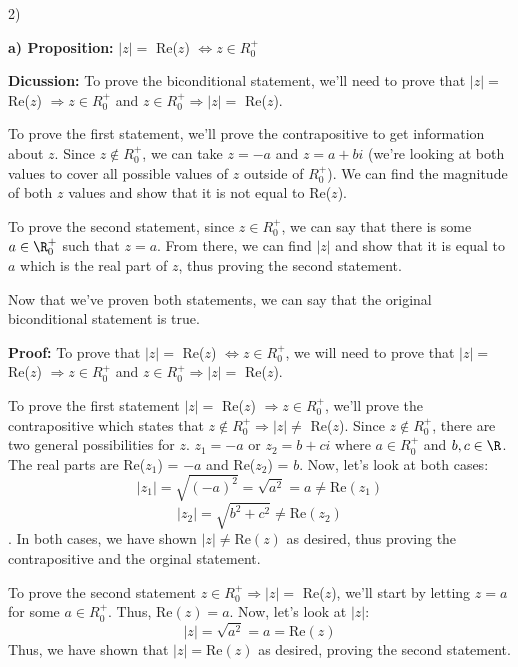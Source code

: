     \begin{paragraph}{2)}

        \textbf{a) Proposition:} $|z| =$ Re($z$) $\iff z \in R_0^+$
        \spacing

        \textbf{Dicussion:} To prove the biconditional statement, 
        we'll need to prove that $|z| =$ Re($z$) $\Rightarrow z \in R_0^+$
        and $z \in R_0^+ \Rightarrow |z| =$ Re($z$).
        \spacing

        To prove the first statement, we'll prove the contrapositive
        to get information about $z$. Since $z \notin R_0^+$, we can 
        take $z = -a$ and $z = a + bi$ (we're looking at both values
        to cover all possible values of $z$ outside of $R_0^+$). We 
        can find the magnitude of both $z$ values and show that it is 
        not equal to Re($z$).
        \spacing

        To prove the second statement, since $z \in R_0^+$, we can say 
        that there is some $a \in \R_0^+$ such that $z = a$. From there,
        we can find $|z|$ and show that it is equal to $a$ which is the real
        part of $z$, thus proving the second statement.
        \spacing

        Now that we've proven both statements, we can say that the 
        original biconditional statement is true.
        \spacing

        \textbf{Proof:} To prove that $|z| =$ Re($z$) $\iff z \in R_0^+$, 
        we will need to prove that $|z| = $ Re($z$) $\Rightarrow z \in R_0^+$
        and $z \in R_0^+ \Rightarrow |z| =$ Re($z$).
        \spacing

        To prove the first statement $|z| = $ Re($z$) $\Rightarrow z \in R_0^+$, we'll prove the contrapositive which
        states that $z \notin R_0^+ \Rightarrow |z| \neq$ Re($z$).
        Since $z \notin R_0^+$, there are two general possibilities for 
        $z$. $z_1 = -a$ or $z_2 = b + ci$ where $a \in R_0^+$ and $b, c \in \R$.
        The real parts are Re($z_1$) = $-a$ and Re($z_2$) = $b$. Now, let's look at both cases:
        $$|z_1| = \sqrt{(-a)^2} = \sqrt{a^2} = a \neq \text{Re}(z_1)$$
        $$|z_2| = \sqrt{b^2 + c^2} \neq \text{Re}(z_2)$$.
        In both cases, we have shown $|z| \neq \text{Re}(z)$ as desired,
        thus proving the contrapositive and the orginal statement.
        \spacing
        
        To prove the second statement $z \in R_0^+ \Rightarrow |z| =$ Re($z$),
        we'll start by letting $z = a$ for some $a \in R_0^+$. Thus,
        $\text{Re}(z) = a$. Now, let's look at $|z|$:
        $$|z| = \sqrt{a^2} = a = \text{Re}(z)$$
        Thus, we have shown that $|z| = \text{Re}(z)$ as desired, proving the
        second statement. 
        \spacing


\end{paragraph}
